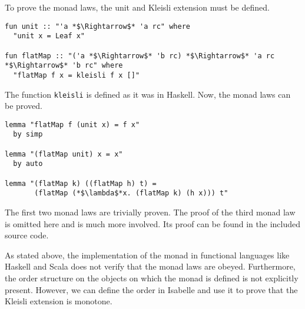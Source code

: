 To prove the monad laws, the unit and Kleisli extension must be defined.
\begin{lstlisting}[language=Isabelle]
fun unit :: "'a *$\Rightarrow$* 'a rc" where
  "unit x = Leaf x"
  
fun flatMap :: "('a *$\Rightarrow$* 'b rc) *$\Rightarrow$* 'a rc *$\Rightarrow$* 'b rc" where
  "flatMap f x = kleisli f x []"   
\end{lstlisting}
The function \texttt{kleisli} is defined as it was in Haskell.  Now, the monad laws can be proved.

\begin{lstlisting}[language=Isabelle]
lemma "flatMap f (unit x) = f x"
  by simp
  
lemma "(flatMap unit) x = x"
  by auto
  
lemma "(flatMap k) ((flatMap h) t) = 
       (flatMap (*$\lambda$*x. (flatMap k) (h x))) t"
\end{lstlisting}
The first two monad laws are trivially proven.  The proof of the third monad law is omitted here and is much more involved.  Its proof can be found in the included source code.

As stated above, the implementation of the monad in functional languages like Haskell and Scala does not verify that the monad laws are obeyed.  Furthermore, the order structure on the objects on which the monad is defined is not explicitly present.  However, we can define the order in Isabelle and use it to prove that the Kleisli extension is monotone.

